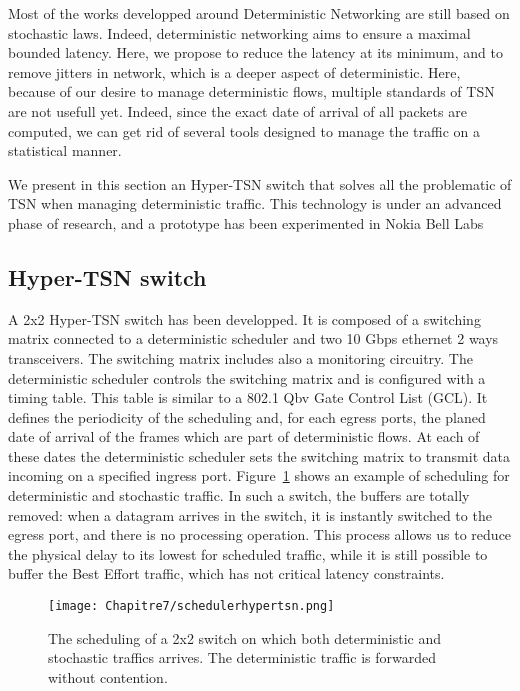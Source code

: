 Most of the works developped around Deterministic Networking are still based on stochastic laws. Indeed, deterministic networking aims to ensure a maximal bounded latency. Here, we propose to reduce the latency at its minimum, and to remove jitters in network, which is a deeper aspect of deterministic.
Here, because of our desire to manage deterministic flows, multiple standards of TSN are not usefull yet. Indeed, since the exact date of arrival of all packets are computed, we can get rid of several tools designed to manage the traffic on a statistical manner. 

We present in this section an Hyper-TSN switch that solves all the problematic of TSN when managing deterministic traffic.
This technology is under an advanced phase of research, and a prototype has been experimented in Nokia Bell Labs~\cite{guiraudleclercmarce2021}

\subsection{Hyper-TSN switch}


A 2x2 Hyper-TSN switch has been developped. It is composed of a switching matrix connected to a deterministic scheduler and two 10 Gbps ethernet 2 ways transceivers. The switching matrix includes also a monitoring circuitry. The deterministic scheduler controls the switching matrix and is configured with a timing table. This table is similar to a 802.1 Qbv Gate Control List (GCL). It defines the periodicity of the scheduling and, for each egress ports, the planed date of arrival of the frames which are part of deterministic flows. At each of these dates the deterministic scheduler sets the switching matrix to transmit data incoming on a specified ingress port. Figure~\ref{fig:schedulehtsn} shows an example of scheduling for deterministic and stochastic traffic.
 In such a switch, the buffers are totally removed: when a datagram arrives in the switch, it is instantly switched to the egress port, and there is no processing operation. This process allows us to reduce the physical delay to its lowest for scheduled traffic, while it is still possible to buffer the Best Effort traffic, which has not critical latency constraints.
\begin{center}

\begin{figure}[h]
  \centering
\texttt{[image: Chapitre7/schedulerhypertsn.png]}
\caption{ The scheduling of a 2x2 switch on which both deterministic and stochastic traffics arrives. The deterministic traffic is forwarded without contention.}
\label{fig:schedulehtsn}
\end{figure}
\end{center}


